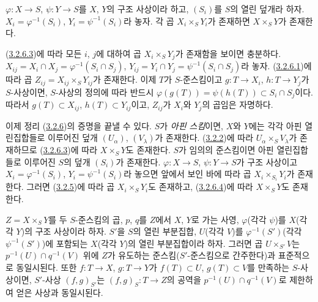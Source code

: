 \begin{lemma}[3.2.6.4]
\label{I.3.2.6.4-ko}
$\varphi:X\to S$, $\psi:Y\to S$를 $X$, $Y$의 구조 사상이라 하고,
$(S_i)$를 $S$의 열린 덮개라 하자. $X_i=\varphi^{-1}(S_i)$,
$Y_i=\psi^{-1}(S_i)$라 놓자. 각 곱 $X_i\times_S Y_i$가 존재하면
$X\times_S Y$가 존재한다.
\end{lemma}

(\hyperref[I.3.2.6.3-ko]{3.2.6.3})에 따라 모든 $i$, $j$에 대하여
곱 $X_i\times_S Y_j$가 존재함을 보이면 충분하다.
$X_{ij}=X_i\cap X_j=\varphi^{-1}(S_i\cap S_j)$,
$Y_{ij}=Y_i\cap Y_j=\psi^{-1}(S_i\cap S_j)$라 놓자.
(\hyperref[I.3.2.6.1-ko]{3.2.6.1})에 따라 곱
$Z_{ij}=X_{ij}\times_S Y_{ij}$가 존재한다. 이제 $T$가 $S$-준스킴이고
$g:T\to X_i$, $h:T\to Y_j$가 $S$-사상이면, $S$-사상의 정의에 따라
반드시 $\varphi(g(T))=\psi(h(T))\subset S_i\cap S_j$이다. 따라서
$g(T)\subset X_{ij}$, $h(T)\subset Y_{ij}$이고, $Z_{ij}$가 $X_i$와
$Y_j$의 곱임은 자명하다.

\begin{env}[3.2.6.5]
\label{I.3.2.6.5-ko}
이제 정리 (\hyperref[I.3.2.6-ko]{3.2.6})의 증명을 끝낼 수 있다.
$S$가 \emph{아핀 스킴}이면, $X$와 $Y$에는 각각 아핀 열린집합들로
이루어진 덮개 $(U_\alpha)$, $(V_\lambda)$가 존재한다.
(\hyperref[I.3.2.2-ko]{3.2.2})에 따라
$U_\alpha\times_S V_\lambda$가 존재하므로
(\hyperref[I.3.2.6.3-ko]{3.2.6.3})에 따라 $X\times_S Y$도 존재한다.
$S$가 임의의 준스킴이면 아핀 열린집합들로 이루어진 $S$의 덮개
$(S_i)$가 존재한다. $\varphi:X\to S$, $\psi:Y\to S$가 구조 사상이고
$X_i=\varphi^{-1}(S_i)$, $Y_i=\psi^{-1}(S_i)$라 놓으면 앞에서 보인
바에 따라 곱 $X_i\times_{S_i}Y_i$가 존재한다.
그러면 (\hyperref[I.3.2.5-ko]{3.2.5})에 따라 곱
$X_i\times_S Y_i$도 존재하고, (\hyperref[I.3.2.6.4-ko]{3.2.6.4})에
따라 $X\times_S Y$도 존재한다.
\end{env}

\begin{corollary}[3.2.7]
\label{I.3.2.7-ko}
$Z=X\times_S Y$를 두 $S$-준스킴의 곱, $p$, $q$를 $Z$에서 $X$, $Y$로
가는 사영, $\varphi$(각각 $\psi$)를 $X$(각각 $Y$)의 구조 사상이라
하자. $S'$을 $S$의 열린 부분집합, $U$(각각 $V$)를
$\varphi^{-1}(S')$(각각 $\psi^{-1}(S')$)에 포함되는 $X$(각각
$Y$)의 열린 부분집합이라 하자. 그러면 곱 $U\times_{S'}V$는
$p^{-1}(U)\cap q^{-1}(V)$ 위에 $Z$가 유도하는 준스킴($S'$-준스킴으로
간주한다)과 표준적으로 동일시된다. 또한 $f:T\to X$, $g:T\to Y$가
$f(T)\subset U$, $g(T)\subset V$를 만족하는 $S$-사상이면,
$S'$-사상 $(f,g)_{S'}$는 $(f,g)_S:T\to Z$의 공역을
$p^{-1}(U)\cap q^{-1}(V)$로 제한하여 얻은 사상과 동일시된다.
\end{corollary}

